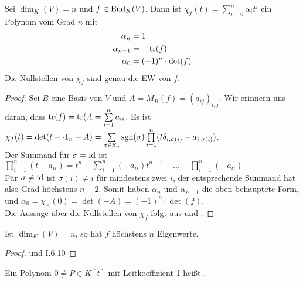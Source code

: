 \begin{proposition}
	Sei $\dim_K(V)=n$ und $f\in\operatorname{End}_K(V)$. Dann ist $\chi_f(t)=\sum\limits_{i=0}^n \alpha_i t^i$ ein Polynom vom Grad $n$ mit 
	\begin{align}
		\alpha_n&=1\notag \\
		\alpha_{n-1}&=-\operatorname{tr}(f) \notag \\
		\alpha_0 &= (-1)^n\cdot\det(f) \notag
	\end{align}
	Die Nullstellen von $\chi_f$ sind genau die EW von $f$.
\end{proposition}
\begin{proof}
	Sei $B$ eine Basis von $V$ und $A=M_B(f)=(a_{ij})_{i,j}$. Wir erinnern uns daran, dass $\operatorname{tr}(f)=\operatorname{tr}(A=\sum\limits_{i=1}^n a_{ii}$. Es ist $\chi_f(t)=\det(t-\cdot 1_n-A)=\sum\limits_{\sigma\in S_n}\operatorname{sgn}(\sigma)\prod\limits_{i=1}^n (t\delta_{i,\sigma(i)}-a_{i,\sigma(i)})$. \\
	Der Summand für \emph{$\sigma=\operatorname{id}$} ist $\prod\limits_{i=1}^n (t-a_{ii})=t^n+\sum\limits_{i=1}^n (-a_{ii})t^{n-1}+...+\prod\limits_{i=1}^n(-a_{ii})$ \\
	Für \emph{$\sigma\neq\operatorname{id}$} ist $\sigma(i)\neq i$ für mindestens zwei $i$, der entsprechende Summand hat also Grad höchstens $n-2$. Somit haben $\alpha_n$ und $\alpha_{n-1}$ die oben behauptete Form, und $\alpha_0=\chi_A(0)=\det(-A)=(-1)^n\cdot\det(f)$. \\
	Die Aussage über die Nullstellen von $\chi_f$ folgt aus  und .
\end{proof}

\begin{conclusion}
	Ist $\dim_K(V)=n$, so hat $f$ höchstens $n$ Eigenwerte.
\end{conclusion}
\begin{proof}
	 und I.6.10 %
\end{proof}

\begin{definition}
	Ein Polynom $0\neq P\in K[t]$ mit Leitkoeffizient 1 heißt .
\end{definition}

